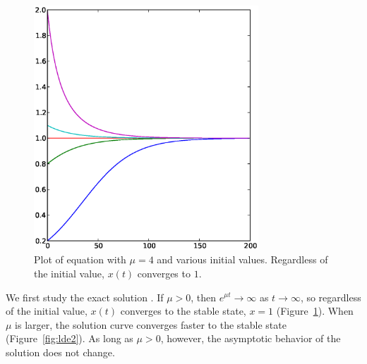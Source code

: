 \documentclass[10pt,twoside,draft]{book}
\begin{document}
\begin{figure}[ht]
  \begin{center}
    \includegraphics[width=0.75\textwidth]{logistic_diffeq_mu4_varyingx0}
  \end{center}
  \caption{
    Plot of equation  with $\mu = 4$ and various initial values. 
  Regardless of the initial value, $x(t)$ converges to $1$.
}
  \label{fig:lde1}
\end{figure}
We first study the exact solution .
If $\mu > 0$, then $e^{\mu t} \to \infty$ as $t \to \infty$, so regardless of the initial value, $x(t)$ converges to the stable state, $x = 1$ (Figure~\ref{fig:lde1}).
%
When $\mu$ is larger, the solution curve converges faster to the stable state (Figure~\ref{fig:lde2}).
As long as $\mu > 0$, however, the asymptotic behavior of the solution does not change.
\end{document}
